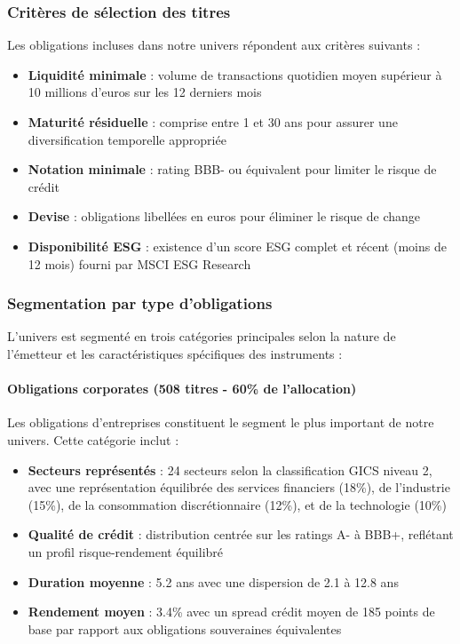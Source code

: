 \subsubsection{Critères de sélection des titres}

Les obligations incluses dans notre univers répondent aux critères suivants :

\begin{itemize}
    \item \textbf{Liquidité minimale} : volume de transactions quotidien moyen supérieur à 10 millions d'euros sur les 12 derniers mois
    \item \textbf{Maturité résiduelle} : comprise entre 1 et 30 ans pour assurer une diversification temporelle appropriée
    \item \textbf{Notation minimale} : rating BBB- ou équivalent pour limiter le risque de crédit
    \item \textbf{Devise} : obligations libellées en euros pour éliminer le risque de change
    \item \textbf{Disponibilité ESG} : existence d'un score ESG complet et récent (moins de 12 mois) fourni par MSCI ESG Research
\end{itemize}

\subsubsection{Segmentation par type d'obligations}

L'univers est segmenté en trois catégories principales selon la nature de l'émetteur et les caractéristiques spécifiques des instruments :

\paragraph{Obligations corporates (508 titres - 60\% de l'allocation)}
Les obligations d'entreprises constituent le segment le plus important de notre univers. Cette catégorie inclut :
\begin{itemize}
    \item \textbf{Secteurs représentés} : 24 secteurs selon la classification GICS niveau 2, avec une représentation équilibrée des services financiers (18\%), de l'industrie (15\%), de la consommation discrétionnaire (12\%), et de la technologie (10\%)
    \item \textbf{Qualité de crédit} : distribution centrée sur les ratings A- à BBB+, reflétant un profil risque-rendement équilibré
    \item \textbf{Duration moyenne} : 5.2 ans avec une dispersion de 2.1 à 12.8 ans
    \item \textbf{Rendement moyen} : 3.4\% avec un spread crédit moyen de 185 points de base par rapport aux obligations souveraines équivalentes
\end{itemize}

